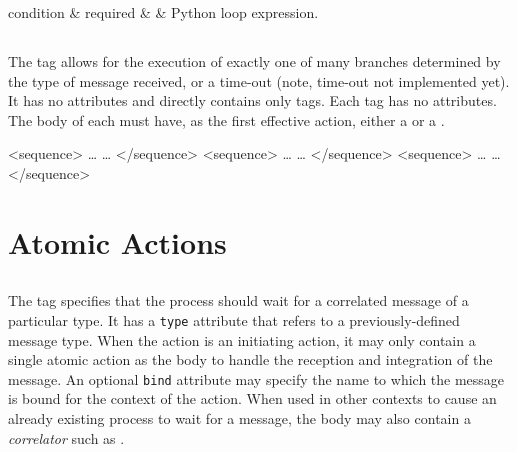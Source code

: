 \begin{attrDefs}
condition	&	required	&			& Python loop expression. \\
\end{attrDefs}

\subsection{}

The  tag allows for the execution of exactly one
of many branches determined by the type of message received,
or a time-out (note, time-out not implemented yet).  It has
no attributes and directly contains only  tags.
Each  tag has no attributes.  The body of each
 must have, as the first effective action, 
either a  or a .

\begin{codelisting}
        <sequence>
            \dots
            \dots
        </sequence>
        <sequence>
            \dots
            \dots
        </sequence>
        <sequence>
            \dots
            \dots
        </sequence>
\end{codelisting}



\clearpage

\section{Atomic Actions}

\subsection{}

The  tag specifies that the process should wait
for a correlated message of a particular type.  It has a \verb|type|
attribute that refers to a previously-defined message type.
When the  action is an initiating action, it may
only contain a single atomic action as the body to handle the
reception and integration of the message.   An optional \verb|bind|
attribute may specify the name to which the message is bound for
the context of the action. When used in other
contexts to cause an already existing process to wait for a message,
the body may also contain a \emph{correlator} such as 
.

